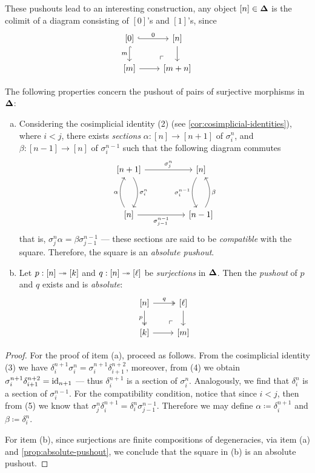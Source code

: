 These pushouts lead to an interesting construction, any object \([n] \in {\mathbf{\Delta}}\)
is the colimit of a diagram consisting of \([0]\)'s and \([1]\)'s, since
\[
\begin{tikzcd}
{[0]} \ar[r, hook, "0"]
\ar[d, hook, "m"'] \ar[rd, phantom, very near end, "\ulcorner"]
&{[n]} \ar[d] \\
{[m]} \ar[r] &{[m + n]}
\end{tikzcd}
\]

\begin{lemma}
\label{lem:splx-cat-pushout-surjections}
The following properties concern the pushout of pairs of surjective morphisms in
\({\mathbf{\Delta}}\):
\begin{enumerate}[(a)]\setlength\itemsep{0em}
\item Considering the cosimplicial identity (2) (see
  \cref{cor:cosimplicial-identities}), where \(i < j\), there exists
  \emph{sections} \(\alpha: [n] \to [n+1]\) of \(\sigma_i^n\), and
  \(\beta: [n-1] \to [n]\) of \(\sigma_i^{n-1}\) such that the following diagram
  commutes
  \[
  \begin{tikzcd}
  {[n+1]} \ar[rr, "\sigma_j^n"] \ar[dd, bend left, "\sigma_i^n"]
  &&{[n]} \ar[dd, bend right, "\sigma_i^{n-1}"'] \\ & &\\
  {[n]} \ar[uu, bend left, "\alpha"] \ar[rr, "\sigma_{j-1}^{n-1}"']
  &&{[n-1]} \ar[uu, bend right, "\beta"']
  \end{tikzcd}
  \]
  that is, \(\sigma_j^n \alpha = \beta \sigma_{j-1}^{n-1}\) --- these sections
  are said to be \emph{compatible} with the square. Therefore, the square is an
  \emph{absolute pushout}.
\item Let \(p: [n] \twoheadrightarrow [k]\) and \(q: [n] \twoheadrightarrow [\ell]\) be \emph{surjections}
  in \({\mathbf{\Delta}}\). Then the \emph{pushout} of \(p\) and \(q\) exists and is
  \emph{absolute}:
  \[
  \begin{tikzcd}
  {[n]} \ar[r, two heads, "q"]
  \ar[d, two heads, "p"']
  \ar[rd, very near end, phantom, "\ulcorner"]
  &{[\ell]} \ar[d] \\
  {[k]} \ar[r] &{[m]}
  \end{tikzcd}
  \]
\end{enumerate}
\end{lemma}

\begin{proof}
For the proof of item (a), proceed as follows. From the cosimplicial identity
(3) we have \(\delta_i^{n+1} \sigma_i^n = \sigma_i^{n+1} \delta_{i+1}^{n+2}\),
moreover, from (4) we obtain \(\sigma_i^{n+1} \delta_{i+1}^{n+2} = \operatorname{id}_{n+1}\)
--- thus \(\delta_i^{n+1}\) is a section of \(\sigma_i^n\). Analogously, we find
that \(\delta_i^n\) is a section of \(\sigma_i^{n-1}\). For the
compatibility condition, notice that since \(i < j\), then from (5) we know that
\(\sigma_j^n \delta_i^{n+1} = \delta_i^n \sigma_{j-1}^{n-1}\). Therefore we may
define \(\alpha \coloneq \delta_i^{n+1}\) and \(\beta \coloneq \delta_i^n\).

For item (b), since surjections are finite compositions of degeneracies, via
item (a) and \cref{prop:absolute-pushout}, we conclude that the square in (b) is
an absolute pushout.
\end{proof}

